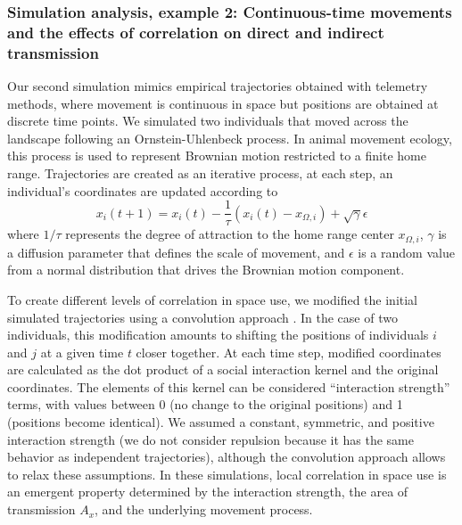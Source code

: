 \documentclass[letterpaper]{article}
\begin{document}
\subsubsection*{Simulation analysis, example 2: Continuous-time movements and the effects of correlation on direct and indirect transmission}

Our second simulation mimics empirical trajectories obtained with telemetry methods, where movement is continuous in space but positions are obtained at discrete time points. We simulated two individuals that moved across the landscape following an Ornstein-Uhlenbeck process. In animal movement ecology, this process is used to represent Brownian motion restricted to a finite home range. Trajectories are created as an iterative process, at each step, an individual's coordinates are updated according to 
\begin{equation}
	x_i(t+1)=x_i(t)-\frac{1}{\tau}(x_i(t)-x_{\Omega,i})+\sqrt{\gamma}\epsilon
\end{equation}
where $1/\tau$ represents the degree of attraction to the home range center $x_{\Omega,i}$, $\gamma$ is a diffusion parameter that defines the scale of movement, and $\epsilon$ is a random value from a normal distribution that drives the Brownian motion component. 

To create different levels of correlation in space use, we modified the initial simulated trajectories using a convolution approach \citep{Scharf2018}. In the case of two individuals, this modification amounts to shifting the positions of individuals $i$ and $j$ at a given time $t$ closer together. At each time step, modified coordinates are calculated as the dot product of a social interaction kernel and the original coordinates. The elements of this kernel can be considered ``interaction strength'' terms, with values between 0 (no change to the original positions) and 1 (positions become identical). We assumed a constant, symmetric, and positive interaction strength (we do not consider repulsion because it has the same behavior as independent trajectories), although the convolution approach allows to relax these assumptions. In these simulations, local correlation in space use is an emergent property determined by the interaction strength, the area of transmission $A_x$, and the underlying movement process. %
\end{document}
